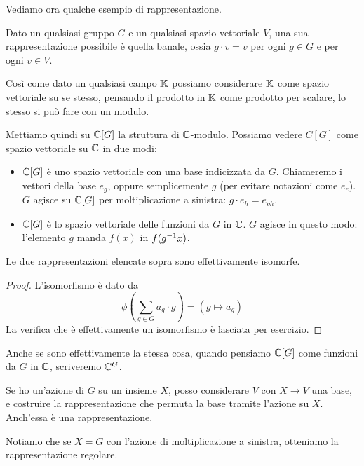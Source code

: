 	Vediamo ora qualche esempio di rappresentazione.

	\begin{myexample}
		Dato un qualsiasi gruppo $G$ e un qualsiasi spazio vettoriale $V$, una sua rappresentazione possibile è quella banale, ossia  $g\cdot v = v$ per ogni $g\in G$ e per ogni $v\in V$.
	\end{myexample}
	\begin{myexample}
		Così come dato un qualsiasi campo $\mathbb K$ possiamo considerare $\mathbb K$ come spazio vettoriale su se stesso, pensando il prodotto in $\mathbb K$ come prodotto per scalare, lo stesso si può fare con un modulo.
		
		Mettiamo quindi su $\mathbb C[G]$ la struttura di $\mathbb C$-modulo. Possiamo vedere $C[G]$ come spazio vettoriale su $\mathbb C$ in due modi:
		\begin{itemize}
		 \item $\mathbb C[G]$ è uno spazio vettoriale con una base indicizzata da $G$. Chiameremo i vettori della base $e_g$, oppure semplicemente $g$ (per evitare notazioni come $e_e$). $G$ agisce su $\mathbb C[G]$ per moltiplicazione a sinistra: $g\cdot e_h = e_{gh}$.
		 \item $\mathbb C[G]$ è lo spazio vettoriale delle funzioni da $G$ in $\mathbb C$. $G$ agisce in questo modo: l'elemento $g$ manda $f(x)$ in $f(g^{-1} x)$.
		\end{itemize}
		
		\begin{myprop}
		 Le due rappresentazioni elencate sopra sono effettivamente isomorfe.
		\end{myprop}
		\begin{proof}
		 L'isomorfismo è dato da \[\phi\left(\sum_{g\in G} a_g\cdot g\right)= \left(g\mapsto a_g\right)\]
		 La verifica che è effettivamente un isomorfismo è lasciata per esercizio.
		\end{proof}

		Anche se sono effettivamente la stessa cosa, quando pensiamo $\mathbb C[G]$ come funzioni da $G$ in $\mathbb C$, scriveremo $\mathbb C^{G}$.
		
	\end{myexample}
	\begin{myexample}
		Se ho un'azione di $G$ su un insieme $X$, posso considerare $V$ con $X\rightarrow V$ una base, e costruire la rappresentazione che permuta la base tramite l'azione su $X$. Anch'essa è una rappresentazione.
		
		Notiamo che se $X=G$ con l'azione di moltiplicazione a sinistra, otteniamo la rappresentazione regolare.
	\end{myexample}

